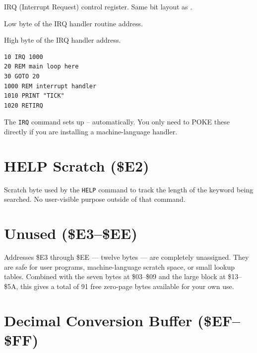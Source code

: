 
IRQ (Interrupt Request) control register.  Same bit layout as .



Low byte of the IRQ handler routine address.


High byte of the IRQ handler address.

\begin{lstlisting}
10 IRQ 1000
20 REM main loop here
30 GOTO 20
1000 REM interrupt handler
1010 PRINT "TICK"
1020 RETIRQ
\end{lstlisting}

The \texttt{IRQ} command sets up -- automatically.  You
only need to POKE these directly if you are installing a machine-language
handler.

\section{HELP Scratch (\$E2)}


Scratch byte used by the \texttt{HELP} command to track the length of the
keyword being searched.  No user-visible purpose outside of that command.

\section{Unused (\$E3--\$EE)}

Addresses \$E3 through \$EE --- twelve bytes --- are completely unassigned.
They are safe for user programs, machine-language scratch space, or small
lookup tables.  Combined with the seven bytes at \$03--\$09 and the large
block at \$13--\$5A, this gives a total of 91 free zero-page bytes available
for your own use.

\section{Decimal Conversion Buffer (\$EF--\$FF)}

